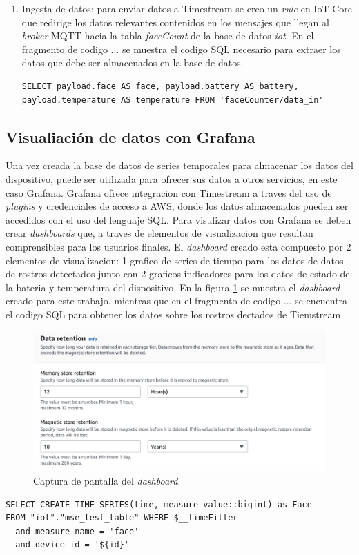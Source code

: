 \begin{enumerate}
	\item Ingesta de datos: para enviar datos a Timestream se creo un \textit{rule} en IoT Core que redirige los datos relevantes contenidos en los mensajes que llegan al \textit{broker} MQTT hacia la tabla \textit{faceCount} de la base de datos \textit{iot}. En el fragmento de codigo ... se muestra el codigo SQL necesario para extraer los datos que debe ser almacenados en la base de datos.
\begin{lstlisting}[label=cod:policie_json,caption=Codigo SQL del \textit{rule} para .]
SELECT payload.face AS face, payload.battery AS battery, payload.temperature AS temperature FROM 'faceCounter/data_in'
\end{lstlisting}	
	
\end{enumerate}

\subsection{Visualiación de datos con Grafana}
Una vez creada la base de datos de series temporales para almacenar los datos del dispositivo, puede ser utilizada para ofrecer sus datos a otros servicios, en este caso Grafana. Grafana ofrece integracion con Timestream a traves del uso de \textit{plugins} y credenciales de acceso a AWS, donde los datos almacenados pueden ser accedidos con el uso del lenguaje SQL. Para visulizar datos con Grafana se deben crear \textit{dashboards} que, a traves de elementos de visualizacion que resultan comprensibles para los usuarios finales. El \textit{dashboard} creado esta compuesto por 2 elementos de visualizacion: 1 grafico de series de tiempo para los datos de datos de rostros detectados junto con 2 graficos indicadores para los datos de estado de la bateria y temperatura del dispositivo. En la figura \ref{fig:gr_dashboard} se muestra el \textit{dashboard} creado para este trabajo, mientras que en el fragmento de codigo ... se encuentra el codigo SQL para obtener los datos sobre los rostros dectados de Tiemstream.

\begin{figure}[h]
	\centering
	\includegraphics[scale=0.45]{./Figures/cc_ts_table.png}
	\caption{Captura de pantalla del \textit{dashboard}.}
	\label{fig:gr_dashboard}
\end{figure}

\begin{lstlisting}[label=cod:policie_json,caption=Codigo SQL del \textit{rule} para .]
SELECT CREATE_TIME_SERIES(time, measure_value::bigint) as Face
FROM "iot"."mse_test_table" WHERE $__timeFilter
  and measure_name = 'face'
  and device_id = '${id}'
\end{lstlisting}	